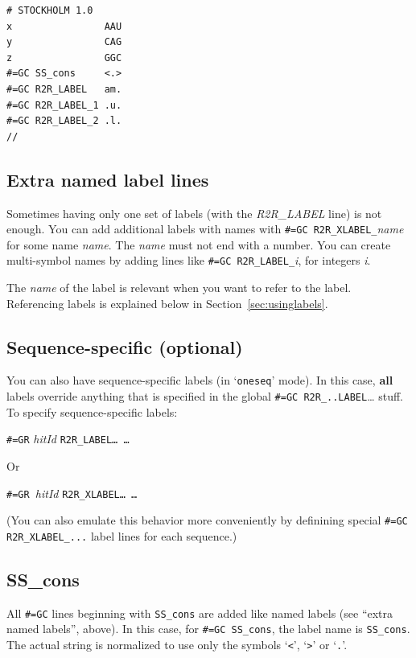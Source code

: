 \documentclass[letterpaper,12pt]{report}
\begin{document}
\begin{verbatim}
# STOCKHOLM 1.0
x                AAU
y                CAG
z                GGC
#=GC SS_cons     <.>
#=GC R2R_LABEL   am.
#=GC R2R_LABEL_1 .u.
#=GC R2R_LABEL_2 .l.
//
\end{verbatim}

\subsection{Extra named label lines }

Sometimes having only one set of labels (with the {\it R2R\_LABEL} line) is not enough.
You can add additional labels with names with {\tt \#=GC
R2R\_XLABEL\_}\textit{name} for some name \textit{name}.  The {\it name} must not end with a number. 
You can create multi-symbol names by adding lines like {\tt \#=GC R2R\_LABEL\_}\textit{i}, for integers {\it i}.

The {\it name} of the label is relevant when you want to refer to the label.
Referencing labels is explained below in Section~\ref{sec:usinglabels}.

\subsection{Sequence-specific (optional)}
You can also have sequence-specific labels (in
{\textquoteleft}{\tt oneseq}{\textquoteright} mode).  In this case,
\textbf{all} labels override anything that is specified in the global
{\tt \#=GC R2R\_..LABEL}{\dots} stuff.  To specify sequence-specific labels:

{\tt \#=GR} \textit{hitId} {\tt R2R\_LABEL{\dots}  {\dots}}

Or

{\tt \#=GR }\textit{hitId} {\tt R2R\_XLABEL{\dots}  {\dots}}

(You can also emulate this behavior more conveniently by definining
special {\tt \#=GC R2R\_XLABEL\_...} label lines for each sequence.)

\subsection[SS\_cons ]{SS\_cons}
All {\tt \#=GC} lines beginning with {\tt SS\_cons} are added like named labels (see
{\textquotedblleft}extra named labels{\textquotedblright}, above).  In
this case, for {\tt \#=GC SS\_cons}, the label name is {\tt SS\_cons}. The actual
string is normalized to use only the symbols
{\textquoteleft}{\tt {\textless}}{\textquoteright},
{\textquoteleft}{\tt {\textgreater}}{\textquoteright} or
{\textquoteleft}{\tt .}{\textquoteright}.
\end{document}
